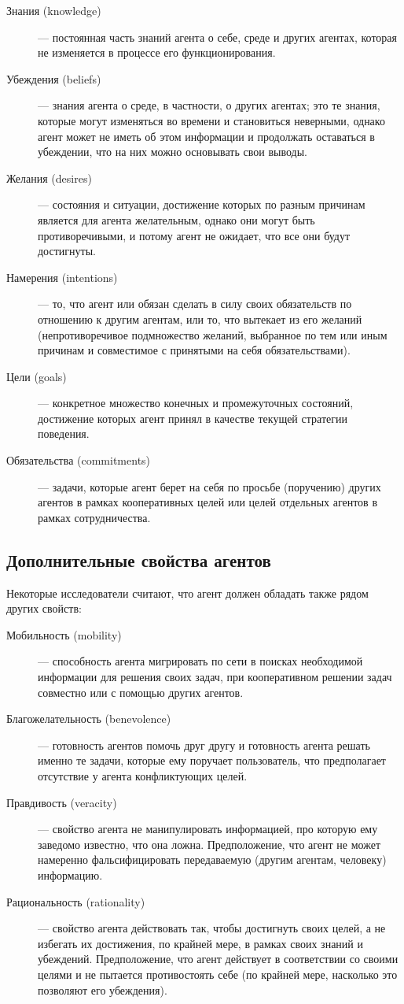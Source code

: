 \begin{description}
  \item[Знания (knowledge)] — постоянная часть знаний агента о себе, среде и других агентах, которая не изменяется в процессе его функционирования.
  \item[Убеждения (beliefs)] — знания агента о среде, в частности, о других агентах; это те знания, которые могут изменяться во времени и становиться неверными, однако агент может не иметь об этом информации и продолжать оставаться в убеждении, что на них можно основывать свои выводы.
  \item[Желания (desires)] — состояния и ситуации, достижение которых по разным причинам является для агента желательным, однако они могут быть противоречивыми, и потому агент не ожидает, что все они будут достигнуты.
  \item[Намерения (intentions)] — то, что агент или обязан сделать в силу своих обязательств по отношению к другим агентам, или то, что вытекает из его желаний (непротиворечивое подмножество желаний, выбранное по тем или иным причинам и совместимое с принятыми на себя обязательствами).
  \item[Цели (goals)] — конкретное множество конечных и промежуточных состояний, достижение которых агент принял в качестве текущей стратегии поведения.
  \item[Обязательства (commitments)] — задачи, которые агент берет на себя по просьбе (поручению) других агентов в рамках кооперативных целей или целей отдельных агентов в рамках сотрудничества.
\end{description}

\subsection{Дополнительные свойства агентов}

Некоторые исследователи считают, что агент должен обладать также рядом других свойств:

\begin{description}
  \item[Мобильность (mobility)] — способность агента мигрировать по сети в поисках необходимой информации для решения своих задач, при кооперативном решении задач совместно или с помощью других агентов.
  \item[Благожелательность (benevolence)] — готовность агентов помочь друг другу и готовность агента решать именно те задачи, которые ему поручает пользователь, что предполагает отсутствие у агента конфликтующих целей.
  \item[Правдивость (veracity)] — свойство агента не манипулировать информацией, про которую ему заведомо известно, что она ложна. Предположение, что агент не может намеренно фальсифицировать передаваемую (другим агентам, человеку) информацию.
  \item[Рациональность (rationality)] — свойство агента действовать так, чтобы достигнуть своих целей, а не избегать их достижения, по крайней мере, в рамках своих знаний и убеждений. Предположение, что агент действует в соответствии со своими целями и не пытается противостоять себе (по крайней мере, насколько это позволяют его убеждения).
\end{description}

